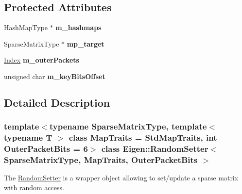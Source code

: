 \subsection*{Protected Attributes}
\begin{DoxyCompactItemize}
\item 
\mbox{\label{class_eigen_1_1_random_setter_a2c80c592f0e2d3bc8d6dab70e8a41af4}} 
Hash\+Map\+Type $\ast$ {\bfseries m\+\_\+hashmaps}
\item 
\mbox{\label{class_eigen_1_1_random_setter_a14a6f93974f16e38d26e544a678ae517}} 
Sparse\+Matrix\+Type $\ast$ {\bfseries mp\+\_\+target}
\item 
\mbox{\label{class_eigen_1_1_random_setter_a1acbf60fa8b0da0ae992b75ff96f3d67}} 
\hyperlink{namespace_eigen_a62e77e0933482dafde8fe197d9a2cfde}{Index} {\bfseries m\+\_\+outer\+Packets}
\item 
\mbox{\label{class_eigen_1_1_random_setter_aa1bc933cf6c76368c1cfc4cac59f680a}} 
unsigned char {\bfseries m\+\_\+key\+Bits\+Offset}
\end{DoxyCompactItemize}


\subsection{Detailed Description}
\subsubsection*{template$<$typename Sparse\+Matrix\+Type, template$<$ typename T $>$ class Map\+Traits = Std\+Map\+Traits, int Outer\+Packet\+Bits = 6$>$\newline
class Eigen\+::\+Random\+Setter$<$ Sparse\+Matrix\+Type, Map\+Traits, Outer\+Packet\+Bits $>$}

The \hyperlink{class_eigen_1_1_random_setter}{Random\+Setter} is a wrapper object allowing to set/update a sparse matrix with random access. 



